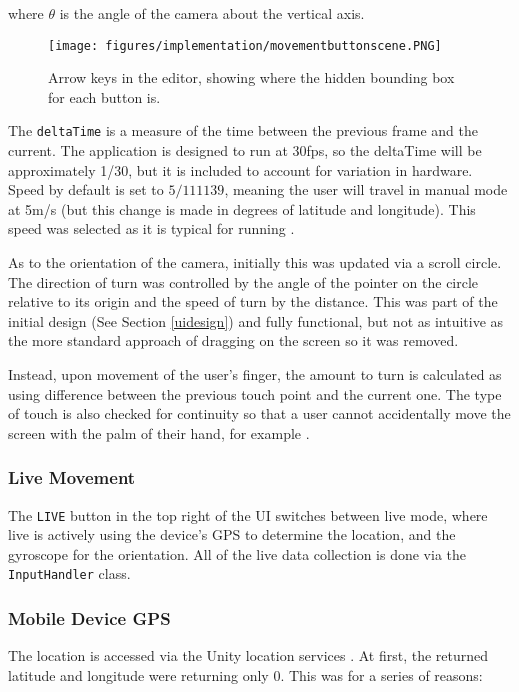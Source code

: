 \documentclass[12pt, a4paper]{article}
\begin{document}
where $\theta$ is the angle of the camera about the vertical axis.

\begin{figure}[]
    \centering
    \texttt{[image: figures/implementation/movementbuttonscene.PNG]}
        \caption{Arrow keys in the editor, showing where the hidden bounding box for each button is.}
        \label{fig:manualmovement}
\end{figure}

The \verb|deltaTime| is a measure of the time between the previous frame and the current. The application is designed to run at 30fps, so the deltaTime will be approximately 1/30, but it is included to account for variation in hardware. Speed by default is set to $5/111139$, meaning the user will travel in manual mode at 5m/s (but this change is made in degrees of latitude and longitude). This speed was selected as it is typical for running \cite{movement:runningspeed}.

As to the orientation of the camera, initially this was updated via a scroll circle. The direction of turn was controlled by the angle of the pointer on the circle relative to its origin and the speed of turn by the distance. This was part of the initial design (See Section \ref{uidesign}) and fully functional, but not as intuitive as the more standard approach of dragging on the screen so it was removed.

Instead, upon movement of the user's finger, the amount to turn is calculated as using difference between the previous touch point and the current one. The type of touch is also checked for continuity so that a user cannot accidentally move the screen with the palm of their hand, for example \cite{movement:touchcontrol}. 

\subsubsection{Live Movement}
The \verb|LIVE| button in the top right of the UI switches between \gls{live} mode, where live is actively using the device's GPS to determine the location, and the gyroscope for the orientation. All of the live data collection is done via the \verb|InputHandler| class. 

\subsubsection{Mobile Device GPS}
The location is accessed via the Unity location services \cite{movement:locationservice}. At first, the returned latitude and longitude were returning only 0. This was for a series of reasons:
\end{document}
